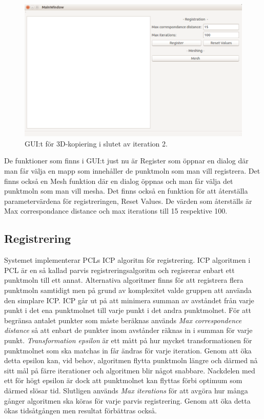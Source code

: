 \begin{figure}[H]
	\centering
	\includegraphics[width=130mm]{figures/3DCopyGUI.PNG}
	\caption{GUI:t för 3D-kopiering i slutet av iteration 2.}
	\label{fig:3dcopy_gui_res}
\end{figure}

De funktioner som finns i GUI:t just nu är Register som öppnar en dialog där man får välja en mapp som innehåller de punktmoln som man vill registrera. Det finns också en Mesh funktion där en dialog öppnas och man får välja det punktmoln som man vill mesha. Det finns också en funktion för att återställa parametervärdena för registreringen, Reset Values. De värden som återställs är Max correspondance distance och max iterations till 15 respektive 100.

\subsection{Registrering}

Systemet implementerar PCLs ICP algoritm för registrering. ICP algoritmen i PCL är en så kallad parvis registreringsalgoritm och regisrerar enbart ett punktmoln till ett annat. Alternativa algoritmer finns för att registrera flera punktmoln samtidigt men på grund av komplexitet valde gruppen att använda den simplare ICP. ICP går ut på att minimera summan av avståndet från varje punkt i det ena punktmolnet till varje punkt i det andra punktmolnet. För att begränsa antalet punkter som måste beräknas används \textit{Max correspondence distance} så att enbart de punkter inom avstånder räknas in i summan för varje punkt. \textit{Transformation epsilon} är ett mått på hur mycket transformationen för punktmolnet som ska matchas in får ändras för varje iteration. Genom att öka detta epsilon kan, vid behov, algoritmen flytta punktmoln längre och därmed nå sitt mål på färre iterationer och algoritmen blir något snabbare. Nackdelen med ett för högt epsilon är dock att punktmolnet kan flyttas förbi optimum som därmed slösar tid. Slutligen används \textit{Max iterations} för att avgöra hur många gånger algoritmen ska köras för varje parvis registrering. Genom att öka detta ökas tidsåtgången men resultat förbättras också.

